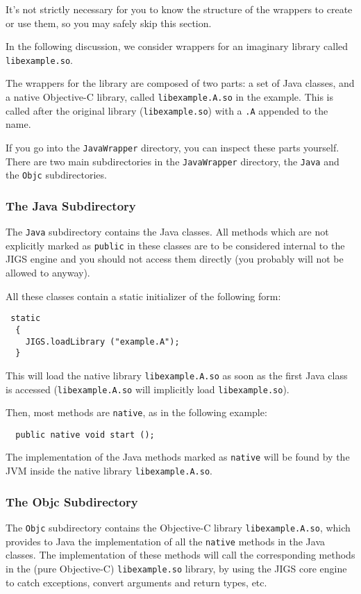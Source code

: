 It's not strictly necessary for you to know the structure of the
wrappers to create or use them, so you may safely skip this section.

In the following discussion, we consider wrappers for an imaginary
library called \texttt{libexample.so}.

The wrappers for the library are composed of two parts: a set of Java
classes, and a native Objective-C library, called
\texttt{libexample.A.so} in the example.  This is called after the 
original library (\texttt{libexample.so}) with a \texttt{.A} appended
to the name.

If you go into the \texttt{JavaWrapper} directory, you can inspect
these parts yourself.  There are two main subdirectories in the
\texttt{JavaWrapper} directory, the \texttt{Java} and the
\texttt{Objc} subdirectories.

\subsubsection{The Java Subdirectory}

The \texttt{Java} subdirectory contains the Java classes.  All methods
which are not explicitly marked as \texttt{public} in these classes
are to be considered internal to the JIGS engine and you should not
access them directly (you probably will not be allowed to anyway).

All these classes contain a static initializer of the following form:
\begin{verbatim}
 static
  {
    JIGS.loadLibrary ("example.A");
  }
\end{verbatim}
This will load the native library \texttt{libexample.A.so} as soon as
the first Java class is accessed (\texttt{libexample.A.so} will
implicitly load \texttt{libexample.so}).

Then, most methods are \texttt{native}, as in the following example: 
\begin{verbatim}
  public native void start ();
\end{verbatim}

The implementation of the Java methods marked as \texttt{native} will
be found by the JVM inside the native library \texttt{libexample.A.so}.

\subsubsection{The Objc Subdirectory}

The \texttt{Objc} subdirectory contains the Objective-C library 
\texttt{libexample.A.so}, which provides to Java the implementation 
of all the \texttt{native} methods in the Java classes.  The
implementation of these methods will call the corresponding methods in
the (pure Objective-C) \texttt{libexample.so} library, by using the
JIGS core engine to catch exceptions, convert arguments and return
types, etc.

